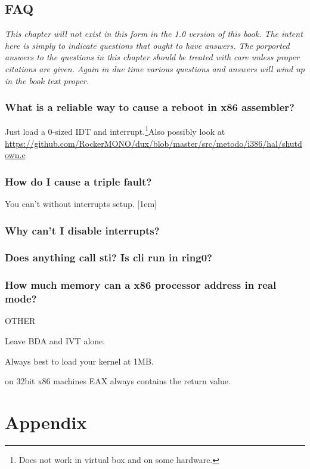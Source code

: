 \documentclass[oneside,english,final]{amsbook}
\newcommand\cn{{\small{\ap{\textbf{[\textit{citation-needed}]}}}}}
\begin{document}
\chapter{FAQ} {\small\textit{This chapter will not exist in this form in
    the 1.0 version of this book. The intent here is simply to indicate
    questions that ought to have answers. The porported
    answers to the questions in this chapter should be treated with care
    unless proper citations are given. Again in due time various questions
    and answers will wind up in the book text proper.}}
\section{What is a reliable way to cause a reboot in x86 assembler?}

Just load a 0-sized IDT and interrupt.\footnote{Does not work in virtual
  box and on some hardware.}\cn Also possibly look at
\url{https://github.com/RockerMONO/dux/blob/master/src/metodo/i386/hal/shutdown.c}


\section{How do I cause a triple fault?}

You can't without interrupts setup.  [1em]

\section{Why can't I disable interrupts?}

\section{Does anything call sti? Is cli run in ring0?}

\section{How much memory can a x86 processor address in real mode?}


OTHER

Leave BDA and IVT alone.

Always best to load your kernel at 1MB.


on 32bit x86 machines EAX always contains the return value.

\appendix
\part{Appendix}


\nocite{*}


\printglossaries

\listoffigures
\listoftables
\end{document}
